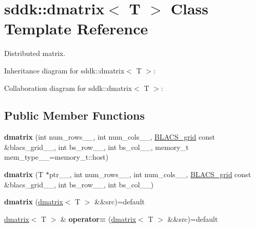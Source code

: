 \hypertarget{classsddk_1_1dmatrix}{}\section{sddk\+:\+:dmatrix$<$ T $>$ Class Template Reference}
\label{classsddk_1_1dmatrix}


Distributed matrix.  




Inheritance diagram for sddk\+:\+:dmatrix$<$ T $>$\+:


Collaboration diagram for sddk\+:\+:dmatrix$<$ T $>$\+:
\subsection*{Public Member Functions}
\begin{DoxyCompactItemize}
\item 
\hypertarget{classsddk_1_1dmatrix_a490c611c433eaa3a095e78abbe394ed5}{}{\bfseries dmatrix} (int num\+\_\+rows\+\_\+\+\_\+, int num\+\_\+cols\+\_\+\+\_\+, \hyperlink{classsddk_1_1_b_l_a_c_s__grid}{B\+L\+A\+C\+S\+\_\+grid} const \&blacs\+\_\+grid\+\_\+\+\_\+, int bs\+\_\+row\+\_\+\+\_\+, int bs\+\_\+col\+\_\+\+\_\+, memory\+\_\+t mem\+\_\+type\+\_\+\+\_\+=memory\+\_\+t\+::host)\label{classsddk_1_1dmatrix_a490c611c433eaa3a095e78abbe394ed5}

\item 
\hypertarget{classsddk_1_1dmatrix_ac05e803248867da48a635691b51fe292}{}{\bfseries dmatrix} (T $\ast$ptr\+\_\+\+\_\+, int num\+\_\+rows\+\_\+\+\_\+, int num\+\_\+cols\+\_\+\+\_\+, \hyperlink{classsddk_1_1_b_l_a_c_s__grid}{B\+L\+A\+C\+S\+\_\+grid} const \&blacs\+\_\+grid\+\_\+\+\_\+, int bs\+\_\+row\+\_\+\+\_\+, int bs\+\_\+col\+\_\+\+\_\+)\label{classsddk_1_1dmatrix_ac05e803248867da48a635691b51fe292}

\item 
\hypertarget{classsddk_1_1dmatrix_a56d15659a04bd167cae8796c1150f6c8}{}{\bfseries dmatrix} (\hyperlink{classsddk_1_1dmatrix}{dmatrix}$<$ T $>$ \&\&src)=default\label{classsddk_1_1dmatrix_a56d15659a04bd167cae8796c1150f6c8}

\item 
\hypertarget{classsddk_1_1dmatrix_ac413daf8adeade2cf43975aed0b6aa38}{}\hyperlink{classsddk_1_1dmatrix}{dmatrix}$<$ T $>$ \& {\bfseries operator=} (\hyperlink{classsddk_1_1dmatrix}{dmatrix}$<$ T $>$ \&\&src)=default\label{classsddk_1_1dmatrix_ac413daf8adeade2cf43975aed0b6aa38}


\end{DoxyCompactItemize}
